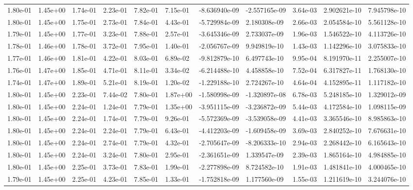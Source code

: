 \begin{longtable}{| p{} | p{} |}
1.80e-01 & 1.45e+00 & 1.74e-01 & 2.23e-01 & 7.82e-01 & 7.15e-01 & -8.636940e-09 & -2.557165e-09 &  3.64e-03 &  2.902621e-10 &  7.945798e-10 \\
1.80e-01 & 1.45e+00 & 1.75e-01 & 2.73e-01 & 7.84e-01 & 4.43e-01 & -5.729984e-09 &  2.180308e-09 &  2.66e-03 &  2.054584e-10 &  5.561128e-10 \\
1.79e-01 & 1.45e+00 & 1.77e-01 & 3.23e-01 & 7.88e-01 & 2.57e-01 & -3.645346e-09 &  2.733037e-09 &  1.96e-03 &  1.546522e-10 &  4.113726e-10 \\
1.78e-01 & 1.46e+00 & 1.78e-01 & 3.72e-01 & 7.95e-01 & 1.40e-01 & -2.056767e-09 &  9.949819e-10 &  1.43e-03 &  1.142296e-10 &  3.075833e-10 \\
1.77e-01 & 1.46e+00 & 1.81e-01 & 4.22e-01 & 8.03e-01 & 6.89e-02 & -9.812879e-10 &  6.497743e-10 &  9.95e-04 &  8.191970e-11 &  2.255007e-10 \\
1.76e-01 & 1.47e+00 & 1.85e-01 & 4.71e-01 & 8.11e-01 & 3.34e-02 & -6.214488e-10 &  4.458858e-10 &  7.52e-04 &  6.317827e-11 &  1.768130e-10 \\
1.74e-01 & 1.47e+00 & 1.89e-01 & 5.21e-01 & 8.19e-01 & 1.20e-02 & -1.229188e-10 &  2.724267e-10 &  4.64e-04 &  4.152895e-11 &  1.117182e-10 \\
1.80e-01 & 1.45e+00 & 2.23e-01 & 7.44e-02 & 7.80e-01 & 1.87e+00 & -1.580998e-09 & -1.320897e-08 &  6.78e-03 &  5.248185e-10 &  1.329012e-09 \\
1.80e-01 & 1.45e+00 & 2.24e-01 & 1.24e-01 & 7.79e-01 & 1.35e+00 & -3.951115e-09 & -3.236872e-09 &  5.44e-03 &  4.172584e-10 &  1.098115e-09 \\
1.80e-01 & 1.45e+00 & 2.24e-01 & 1.74e-01 & 7.79e-01 & 9.26e-01 & -5.572369e-09 & -3.539058e-09 &  4.41e-03 &  3.365546e-10 &  8.985863e-10 \\
1.80e-01 & 1.45e+00 & 2.24e-01 & 2.24e-01 & 7.79e-01 & 6.43e-01 & -4.412203e-09 & -1.609458e-09 &  3.69e-03 &  2.840252e-10 &  7.676631e-10 \\
1.80e-01 & 1.45e+00 & 2.24e-01 & 2.74e-01 & 7.79e-01 & 4.32e-01 & -2.705647e-09 & -8.206333e-10 &  2.94e-03 &  2.268442e-10 &  6.165643e-10 \\
1.80e-01 & 1.45e+00 & 2.24e-01 & 3.24e-01 & 7.80e-01 & 2.95e-01 & -2.361651e-09 &  1.339547e-09 &  2.39e-03 &  1.865164e-10 &  4.984885e-10 \\
1.80e-01 & 1.45e+00 & 2.25e-01 & 3.73e-01 & 7.83e-01 & 1.99e-01 & -2.277898e-09 &  8.724582e-10 &  1.91e-03 &  1.481841e-10 &  4.000465e-10 \\
1.79e-01 & 1.45e+00 & 2.25e-01 & 4.23e-01 & 7.85e-01 & 1.33e-01 & -1.752818e-09 &  1.177560e-09 &  1.55e-03 &  1.211619e-10 &  3.244076e-10 \\

\end{longtable}
